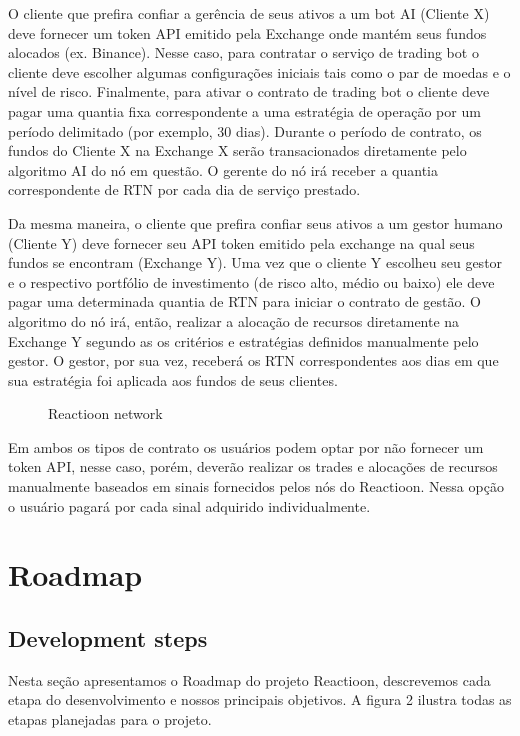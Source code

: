 \documentclass[
	article,			%
	12pt,				%
	oneside,			%
	a4paper,			%
	brazil,				%
	english,
	sumario=tradicional
	]{abntex2}
\begin{document}
O cliente que prefira confiar a gerência de seus ativos a um bot AI (Cliente X) deve fornecer um token API emitido pela Exchange onde mantém seus fundos alocados (ex. Binance). Nesse caso, para contratar o serviço de trading bot o cliente deve escolher algumas configurações iniciais tais como o par de moedas e o nível de risco. Finalmente, para ativar o contrato de trading bot o cliente deve pagar uma quantia fixa correspondente a uma estratégia de operação por um período delimitado (por exemplo, 30 dias). Durante o período de contrato, os fundos do Cliente X na Exchange X serão transacionados diretamente pelo algoritmo AI do nó em questão. O gerente do nó irá receber a quantia correspondente de RTN por cada dia de serviço prestado.

Da mesma maneira, o cliente que prefira confiar seus ativos a um gestor humano (Cliente Y) deve fornecer seu API token emitido pela exchange na qual seus fundos se encontram (Exchange Y). Uma vez que o cliente Y escolheu seu gestor e o respectivo portfólio de investimento (de risco alto, médio ou baixo) ele deve pagar uma determinada quantia de RTN para iniciar o contrato de gestão. O algoritmo do nó irá, então, realizar a alocação de recursos diretamente na Exchange Y segundo as os critérios e estratégias definidos manualmente pelo gestor. O gestor, por sua vez, receberá os RTN correspondentes aos dias em que sua estratégia foi aplicada aos fundos de seus clientes.

\begin{figure}[H]
    \centering
    \makebox[\textwidth]{}
\caption{Reactioon network}
\end{figure}

Em ambos os tipos de contrato os usuários podem optar por não fornecer um token API, nesse caso, porém, deverão realizar os trades e alocações de recursos manualmente baseados em sinais fornecidos pelos nós do Reactioon. Nessa opção o usuário pagará por cada sinal adquirido individualmente. 

\section{Roadmap}
\subsection{Development steps}
Nesta seção apresentamos o Roadmap do projeto Reactioon, descrevemos cada etapa do desenvolvimento e nossos principais objetivos. A figura 2 ilustra todas as etapas planejadas para o projeto.
\end{document}
